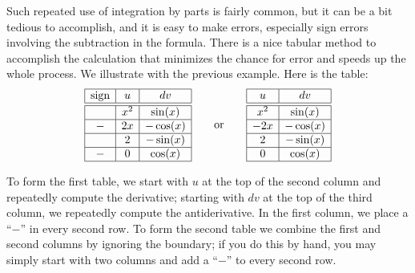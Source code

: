 \documentclass{ximera}
\begin{document}
Such repeated use of integration by parts is fairly common, but it can
be a bit tedious to accomplish, and it is easy to make
errors, especially sign errors involving the subtraction in the
formula. There is a nice tabular method to accomplish the calculation
that minimizes the chance for error and speeds up the whole
process. We illustrate with the previous example. Here is the
table:
\[
\begin{array}{|c|c|c|}\hline
\text{sign} & u & dv \\ \hline \hline
 & x^2 & \sin(x) \\ \hline
- & 2x & -\cos(x) \\ \hline
  & 2  & -\sin(x) \\ \hline
- & 0  & \cos(x) \\ \hline
\end{array}
\qquad\text{or}\qquad
\begin{array}{|c|c|}\hline
u & dv \\ \hline\hline
x^2 & \sin(x) \\ \hline 
-2x & -\cos(x) \\\hline
2 & -\sin(x)\\\hline
0 & \cos(x)\\\hline
\end{array}
\]

To form the first table, we start with $u$ at the top of the second
column and repeatedly compute the derivative; starting with $dv$ at
the top of the third column, we repeatedly compute the
antiderivative. In the first column, we place a ``$-$'' in every
second row. To form the second table we combine the first and second
columns by ignoring the boundary; if you do this by hand, you may
simply start with two columns and add a ``$-$'' to every second row.
\end{document}
